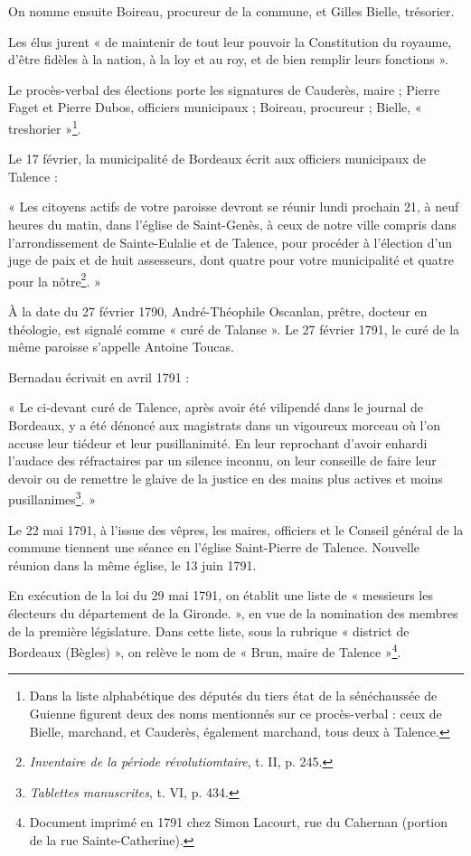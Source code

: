 \documentclass[a4paper,11pt]{book}
\begin{document}
On nomme ensuite Boireau, procureur de la commune, et Gilles Bielle, trésorier.

Les élus jurent « de maintenir de tout leur pouvoir la Constitution du royaume, d'être fidèles à la nation, à la loy et au roy, et de bien remplir leurs fonctions ».

Le procès-verbal des élections porte les signatures de Cauderès, maire ; Pierre Faget et Pierre Dubos, officiers municipaux ; Boireau, procureur ; Bielle, « treshorier »\footnote{Dans la liste alphabétique des députés du tiers état de la sénéchaussée de Guienne figurent deux des noms mentionnés sur ce procès-verbal : ceux de Bielle, marchand, et Cauderès, également marchand, tous deux à Talence.}.

Le 17 février, la municipalité de Bordeaux écrit aux officiers municipaux de Talence :

« Les citoyens actifs de votre paroisse devront se réunir lundi prochain 21, à neuf heures du matin, dans l'église de Saint-Genès, à ceux de notre ville compris dans l'arrondissement de Sainte-Eulalie et de Talence, pour procéder à l'élection d'un juge de paix et de huit assesseurs, dont quatre pour votre municipalité et quatre pour la nôtre\footnote{\textit{Inventaire de la période révolutiomtaire}, t. II, p. 245.}. »

À la date du 27 février 1790, André-Théophile Oscanlan, prêtre, docteur en théologie, est signalé comme « curé de Talanse ». Le 27 février 1791, le curé de la même paroisse s'appelle Antoine Toucas.

Bernadau écrivait en avril 1791 :

« Le ci-devant curé de Talence, après avoir été vilipendé dans le journal de Bordeaux, y a été dénoncé aux magistrats dans un vigoureux morceau où l'on accuse leur tiédeur et leur pusillanimité. En leur reprochant d'avoir enhardi l'audace des réfractaires par un silence inconnu, on leur conseille de faire leur devoir ou de remettre le glaive de la justice en des mains plus actives et moins pusillanimes\footnote{\textit{Tablettes manuscrites}, t. VI, p. 434.}. »

Le 22 mai 1791, à l'issue des vêpres, les maires, officiers et le Conseil général de la commune tiennent une séance en l'église Saint-Pierre de Talence. Nouvelle réunion dans la même église, le 13 juin 1791.

En exécution de la loi du 29 mai 1791, on établit une liste de « messieurs les électeurs du département de la Gironde. », en vue de la nomination des membres de la première législature. Dans cette liste, sous la rubrique « district de Bordeaux (Bègles) », on relève le nom de « Brun, maire de Talence »\footnote{Document imprimé en 1791 chez Simon Lacourt, rue du Cahernan (portion de la rue Sainte-Catherine).}.
\end{document}
